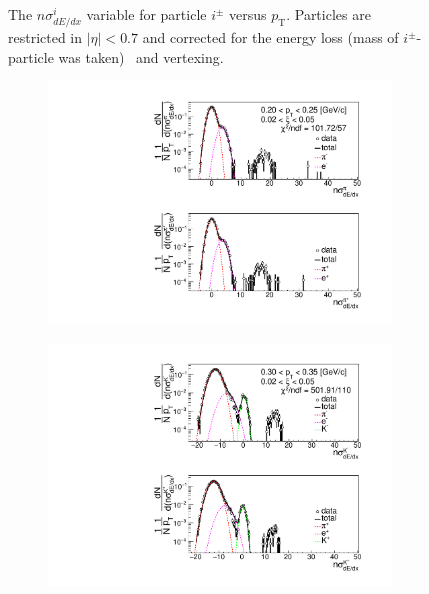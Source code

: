 \begin{figure}[h!]
\begin{subfigure}{.49\textwidth}
	\end{subfigure}
	\begin{minipage}{.49\textwidth}
			\caption{
			The $n\sigma^{i}_{dE/dx}$ variable for particle $i^\pm$ versus $p_\textrm{T}$. Particles are restricted in $|\eta| < 0.7$ and corrected for the energy loss (mass of $i^\pm$-particle was taken)~\cite{supplementaryNote} and vertexing.}
		\label{fig:dEdx_nsigma}
	\end{minipage}
	\vspace{1em}
\end{figure}

\begin{figure}[h!]
	\centering
	\begin{subfigure}{.49\textwidth}
		\includegraphics[width=\linewidth, page=9]{chapters/chrgSTAR/img/dEdx/fit2019_secondStep_0_0.pdf}
	\end{subfigure}
	\begin{subfigure}{.49\textwidth}
		\includegraphics[width=\linewidth, page=7]{chapters/chrgSTAR/img/dEdx/fit2019_thirdStep_1_0.pdf}

\end{subfigure}
\end{figure}
